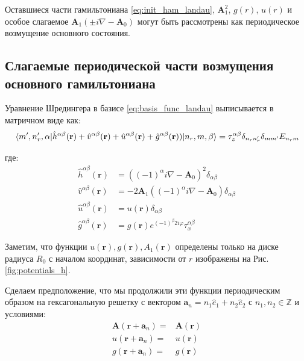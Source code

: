 \documentclass[a4paper,article,14pt]{extarticle}
\begin{document}
Оставшиеся части гамильтониана \eqref{eq:init_ham_landau}, $\mathbf{A}_1^2$, $g(r)$, $u(r)$ и особое слагаемое 
$\mathbf{A}_1  (\pm i \nabla - \mathbf{A}_0 )$ могут быть рассмотрены как периодическое возмущение основного состояния.


\subsection{Слагаемые периодической части возмущения основного гамильтониана}

Уравнение Шредингера в базисе \eqref{eq:basis_func_landau} выписывается в матричном виде как:
\begin{equation}
\label{eq:shred_final}
\mel{m', n'_r, \alpha}{\hat h^{\alpha \beta}(\mathbf{r}) + \hat v^{\alpha \beta}(\mathbf{r}) + \hat u^{\alpha \beta}(\mathbf{r}) + \hat g^{\alpha \beta} (\mathbf{r})) }{n_r,m, \beta} = {\tau_z^{\alpha \beta} \delta_{n_r n'_r} \delta_{m m'} E_{n_r m} }
\end{equation}

\noindent где:
\begin{equation}
\label{eq:definitions}
\begin{aligned}
\hat h^{\alpha \beta}(\mathbf{r})   &= \left( (-1)^\alpha i \nabla - \mathbf{A}_0 \right) ^ 2 \delta_{\alpha \beta} \\
\hat v^{\alpha \beta}(\mathbf{r})   &= - 2 \mathbf{A}_1 \left( (-1)^{\alpha} i \nabla - \mathbf{A}_0 \right) \delta_{\alpha \beta} \\
\hat u^{\alpha \beta}(\mathbf{r})   &= u(\mathbf{r})  \delta_{\alpha \beta}\\
\hat g^{\alpha \beta} (\mathbf{r}) &=   g(\mathbf{r})  e^{ (-1)^{\beta} 2  i   \varphi} \tau^{\alpha \beta}_x 
\end{aligned}
\end{equation}

Заметим, что функции $u(\mathbf{r}), g(\mathbf{r}), A_1(\mathbf{r})$ определены только на диске радиуса $R_0$ с началом координат, зависимости от $r$ изображены на Рис. \ref{fig:potentials_h}.

Сделаем предположение, что мы продолжили эти функции периодическим образом на гексагональную решетку с вектором $\mathbf{a}_n = n_1 \hat {e}_1 + n_2 \hat {e}_2$ с $n_1,n_2 \in \mathbb{Z}$ и условиями:
\begin{equation}
\label{eq:periodic_potentials}
\begin{aligned}
\mathbf{A}(\mathbf{r} + \mathbf{a}_n) =& \mathbf{A}(\mathbf{r}) \\
u(\mathbf{r} + \mathbf{a}_n) =& u(\mathbf{r}) \\
g(\mathbf{r} + \mathbf{a}_n) =& g(\mathbf{r})
\end{aligned}
\end{equation}
\end{document}
